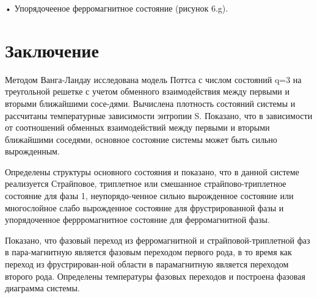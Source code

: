 •	Упорядочееное ферромагнитное состояние (рисунок 6.g).





\section{Заключение}

Методом Ванга-Ландау исследована модель Поттса с числом состояний q=3 на треугольной решетке с учетом обменного взаимодействия между первыми и вторыми ближайшими сосе-дями. Вычислена плотность состояний системы и рассчитаны температурные зависимости энтропии S. Показано, что в зависимости от соотношений обменных взаимодействий между первыми и вторыми ближайшими соседями, основное состояние системы может быть сильно вырожденным.

Определены структуры основного состояния и показано, что в данной системе реализуется Страйповое, триплетное или смешанное страйпово-триплетное состояние для фазы 1, неупорядо-ченное сильно вырожденное состояние или многослойное слабо вырожденное состояние для фрустрированной фазы и упорядоченное феррромагнитное состояние для ферромагнитной фазы.

Показано, что фазовый переход из ферромагнитной и страйповой-триплетной фаз в пара-магнитную является фазовым переходом первого рода, в то время как переход из фрустрирован-ной области в парамагнитную является переходом второго рода. Определены температуры фазовых переходов и построена фазовая диаграмма системы.





